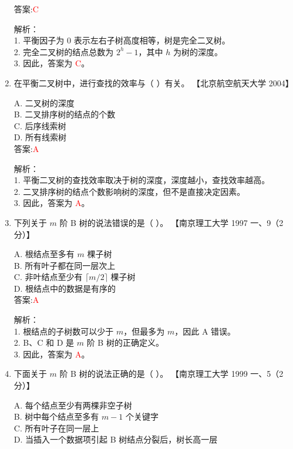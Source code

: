 \documentclass[lang=cn,newtx,10pt,scheme=chinese]{../../../elegantbook}
\begin{document}
\begin{enumerate}
    答案:\textcolor{red}{C}

    解析：\\
    1. 平衡因子为 0 表示左右子树高度相等，树是完全二叉树。\\
    2. 完全二叉树的结点总数为 $2^h - 1$，其中 $h$ 为树的深度。\\
    3. 因此，答案为 \textcolor{red}{C}。\\

\item 在平衡二叉树中，进行查找的效率与（ ）有关。  
    【北京航空航天大学 2004】  

    A. 二叉树的深度 \\  
    B. 二叉排序树的结点的个数 \\  
    C. 后序线索树 \\  
    D. 所有线索树 \\  

    答案:\textcolor{red}{A}

    解析：\\
    1. 平衡二叉树的查找效率取决于树的深度，深度越小，查找效率越高。\\
    2. 二叉排序树的结点个数影响树的深度，但不是直接决定因素。\\
    3. 因此，答案为 \textcolor{red}{A}。\\
    \item 下列关于 $m$ 阶 B 树的说法错误的是（ ）。  
    【南京理工大学 1997 一、9（2 分）】  

    A. 根结点至多有 $m$ 棵子树 \\  
    B. 所有叶子都在同一层次上 \\  
    C. 非叶结点至少有 $\lceil m/2 \rceil$ 棵子树 \\  
    D. 根结点中的数据是有序的 \\  

    答案:\textcolor{red}{A}

    解析：\\
    1. 根结点的子树数可以少于 $m$，但最多为 $m$，因此 A 错误。\\
    2. B、C 和 D 是 $m$ 阶 B 树的正确定义。\\
    3. 因此，答案为 \textcolor{red}{A}。\\

\item 下面关于 $m$ 阶 B 树的说法正确的是（ ）。  
    【南京理工大学 1999 一、5（2 分）】  

    A. 每个结点至少有两棵非空子树 \\  
    B. 树中每个结点至多有 $m-1$ 个关键字 \\  
    C. 所有叶子在同一层上 \\  
    D. 当插入一个数据项引起 B 树结点分裂后，树长高一层 \\  


\end{enumerate}
\end{document}
